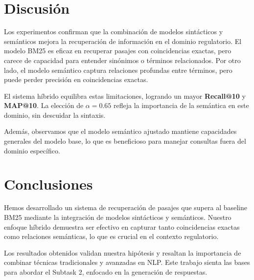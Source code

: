 \documentclass[11pt,english]{article}
\theoremstyle{plain}
\begin{document}
\section{Discusión}

Los experimentos confirman que la combinación de modelos sintácticos y semánticos mejora la recuperación de información en el dominio regulatorio. El modelo BM25 es eficaz en recuperar pasajes con coincidencias exactas, pero carece de capacidad para entender sinónimos o términos relacionados. Por otro lado, el modelo semántico captura relaciones profundas entre términos, pero puede perder precisión en coincidencias exactas.

El sistema híbrido equilibra estas limitaciones, logrando un mayor \textbf{Recall@10} y \textbf{MAP@10}. La elección de $\alpha = 0.65$ refleja la importancia de la semántica en este dominio, sin descuidar la sintaxis.

Además, observamos que el modelo semántico ajustado mantiene capacidades generales del modelo base, lo que es beneficioso para manejar consultas fuera del dominio específico.

\section{Conclusiones}

Hemos desarrollado un sistema de recuperación de pasajes que supera al baseline BM25 mediante la integración de modelos sintácticos y semánticos. Nuestro enfoque híbrido demuestra ser efectivo en capturar tanto coincidencias exactas como relaciones semánticas, lo que es crucial en el contexto regulatorio.

Los resultados obtenidos validan nuestra hipótesis y resaltan la importancia de combinar técnicas tradicionales y avanzadas en NLP. Este trabajo sienta las bases para abordar el Subtask 2, enfocado en la generación de respuestas.
\end{document}
